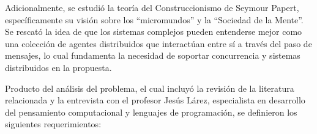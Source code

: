Adicionalmente, se estudió la teoría del Construccionismo de Seymour Papert, específicamente su visión sobre los “micromundos” y la “Sociedad de la Mente”. Se rescató la idea de que los sistemas complejos pueden entenderse mejor como una colección de agentes distribuidos que interactúan entre sí a través del paso de mensajes, lo cual fundamenta la necesidad de soportar concurrencia y sistemas distribuidos en la propuesta.


Producto del análisis del problema, el cual incluyó la revisión de la literatura relacionada y la entrevista con el profesor Jesús Lárez, especialista en desarrollo del pensamiento computacional y lenguajes de programación, se definieron los siguientes requerimientos:


